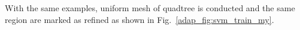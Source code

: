 %
With the same examples, uniform mesh of quadtree is conducted and the same region are marked as refined as shown in Fig.~\ref{adap_fig:svm_train_my}.
\begin{figure}[!ht]
    \centering
    \begin{subfigure}[b]{1\linewidth}
        \centering
    \end{subfigure}
    \begin{subfigure}[b]{0.49\linewidth}
\end{subfigure}
\end{figure}
